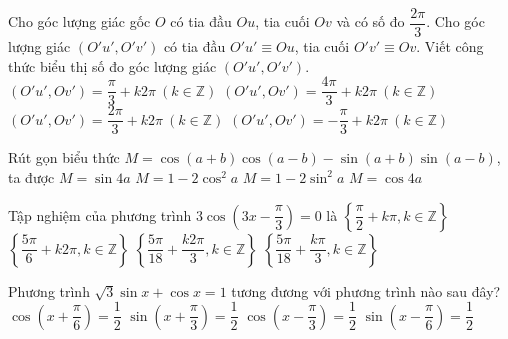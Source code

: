 \begin{ex}%
	Cho góc lượng giác gốc $O$ có tia đầu $Ou$, tia cuối $Ov$ và có số đo $\dfrac{2\pi}{3}$. Cho góc lượng giác $(O'u',O'v')$ có tia đầu $O'u'\equiv Ou$, tia cuối $O'v'\equiv Ov$. Viết công thức biểu thị số đo góc lượng giác $(O'u',O'v')$.
	\choice
	{$(O'u',Ov')=\dfrac{\pi}{3}+k2\pi\ (k\in \mathbb{Z})$}
	{$(O'u',Ov')=\dfrac{4\pi}{3}+k2\pi\ (k\in \mathbb{Z})$}
	{\True $(O'u',Ov')=\dfrac{2\pi}{3}+k2\pi\ (k\in \mathbb{Z})$}
	{$(O'u',Ov')=-\dfrac{\pi}{3}+k2\pi\ (k\in \mathbb{Z})$}
\end{ex}

\begin{ex}%
	Rút gọn biểu thức $M=\cos(a+b)\cos(a-b)-\sin (a+b)\sin(a-b)$, ta được
	\choice
	{$M=\sin 4a$}
	{$M=1-2\cos^2a$}
	{\True $M=1-2\sin^2a$}
	{$M=\cos 4a$}
\end{ex}

\begin{ex}%
	Tập nghiệm của phương trình $3\cos\left(3x-\dfrac{\pi}{3}\right)=0$ là
	\choice
	{$\left\{\dfrac{\pi}{2}+k\pi, k \in \mathbb{Z}\right\}$}
	{$\left\{\dfrac{5\pi}{6}+k 2\pi, k \in \mathbb{Z}\right\}$}
	{$\left\{\dfrac{5\pi}{18}+\dfrac{k 2\pi}{3}, k \in \mathbb{Z}\right\}$}
	{\True $\left\{\dfrac{5\pi}{18}+\dfrac{k\pi}{3}, k \in \mathbb{Z}\right\}$}
\end{ex}

\begin{ex}%
	Phương trình $\sqrt{3}\sin x+\cos x=1$ tương đương với phương trình nào sau đây?
	\choice
	{$\cos \left( x+\dfrac{\pi}{6}\right) =\dfrac{1}{2}$}
	{$\sin \left( x+\dfrac{\pi}{3}\right) =\dfrac{1}{2}$}
	{\True $\cos \left( x-\dfrac{\pi}{3}\right) =\dfrac{1}{2}$}
	{$\sin \left( x-\dfrac{\pi}{6}\right) =\dfrac{1}{2}$}
\end{ex}

